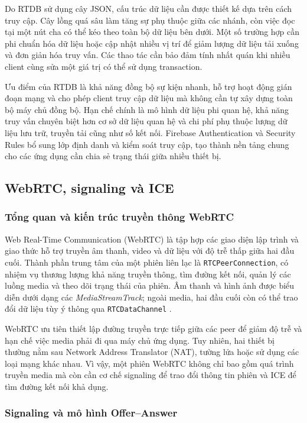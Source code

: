 Do RTDB sử dụng cây JSON, cấu trúc dữ liệu cần được thiết kế dựa trên cách truy cập. Cây lồng quá sâu làm tăng sự phụ thuộc giữa các nhánh, còn việc đọc tại một nút cha có thể kéo theo toàn bộ dữ liệu bên dưới. Một số trường hợp cần phi chuẩn hóa dữ liệu hoặc cập nhật nhiều vị trí để giảm lượng dữ liệu tải xuống và đơn giản hóa truy vấn. Các thao tác cần bảo đảm tính nhất quán khi nhiều client cùng sửa một giá trị có thể sử dụng transaction.

Ưu điểm của RTDB là khả năng đồng bộ sự kiện nhanh, hỗ trợ hoạt động gián đoạn mạng và cho phép client truy cập dữ liệu mà không cần tự xây dựng toàn bộ máy chủ đồng bộ. Hạn chế chính là mô hình dữ liệu phi quan hệ, khả năng truy vấn chuyên biệt hơn cơ sở dữ liệu quan hệ và chi phí phụ thuộc lượng dữ liệu lưu trữ, truyền tải cũng như số kết nối. Firebase Authentication và Security Rules bổ sung lớp định danh và kiểm soát truy cập, tạo thành nền tảng chung cho các ứng dụng cần chia sẻ trạng thái giữa nhiều thiết bị.

\subsection{WebRTC, signaling và ICE}

\subsubsection{Tổng quan và kiến trúc truyền thông WebRTC}

Web Real-Time Communication (WebRTC) là tập hợp các giao diện lập trình và giao thức hỗ trợ truyền âm thanh, video và dữ liệu với độ trễ thấp giữa hai đầu cuối. Thành phần trung tâm của một phiên liên lạc là \texttt{RTCPeerConnection}, có nhiệm vụ thương lượng khả năng truyền thông, tìm đường kết nối, quản lý các luồng media và theo dõi trạng thái của phiên. Âm thanh và hình ảnh được biểu diễn dưới dạng các \textit{MediaStreamTrack}; ngoài media, hai đầu cuối còn có thể trao đổi dữ liệu tùy ý thông qua \texttt{RTCDataChannel} .

WebRTC ưu tiên thiết lập đường truyền trực tiếp giữa các peer để giảm độ trễ và hạn chế việc media phải đi qua máy chủ ứng dụng. Tuy nhiên, hai thiết bị thường nằm sau Network Address Translator (NAT), tường lửa hoặc sử dụng các loại mạng khác nhau. Vì vậy, một phiên WebRTC không chỉ bao gồm quá trình truyền media mà còn cần cơ chế signaling để trao đổi thông tin phiên và ICE để tìm đường kết nối khả dụng.

\subsubsection{Signaling và mô hình Offer--Answer}

